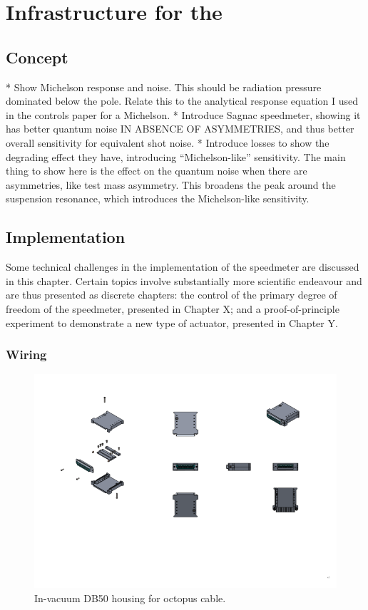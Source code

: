 \chapter{Infrastructure for the \SSMEXPT{}}
\label{c:speedmeter-intro}

\section{Concept}
* Show Michelson response and noise. This should be radiation pressure dominated below the pole. Relate this to the analytical response equation I used in the controls paper for a Michelson.
* Introduce Sagnac speedmeter, showing it has better quantum noise IN ABSENCE OF ASYMMETRIES, and thus better overall sensitivity for equivalent shot noise.
* Introduce losses to show the degrading effect they have, introducing ``Michelson-like'' sensitivity. The main thing to show here is the effect on the quantum noise when there are asymmetries, like test mass asymmetry. This broadens the peak around the suspension resonance, which introduces the Michelson-like sensitivity.

\section{Implementation}

Some technical challenges in the implementation of the speedmeter are discussed in this chapter. Certain topics involve substantially more scientific endeavour and are thus presented as discrete chapters: the control of the primary degree of freedom of the speedmeter, presented in Chapter X; and a proof-of-principle experiment to demonstrate a new type of actuator, presented in Chapter Y.

\subsection{Wiring}


\begin{figure}
  \centering
  \includegraphics[width=0.75\columnwidth]{graphics/40-db50-housing.png}
  \caption{In-vacuum DB50 housing for octopus cable.}
  \label{fig:db50-housing}
\end{figure}